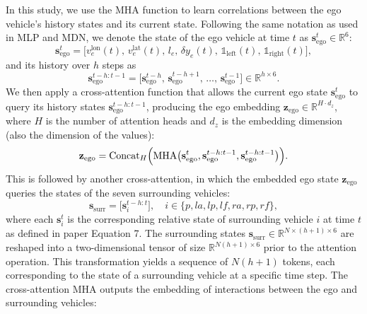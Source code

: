 \documentclass[journal]{IEEEtran}
\begin{document}
In this study, we use the MHA function to learn correlations between the ego vehicle's history states and its current state. Following the same notation as used in MLP and MDN, we denote the state of the ego vehicle at time $t$ as $\mathbf{s}_{\text{ego}}^{t}\in\mathbb{R}^{6}$:
\begin{equation}
    \mathbf{s}_{\text{ego}}^{t} = \bigl[
        v_e^{\text{lon}}(t),\,
        v_e^{\text{lat}}(t),\,
        l_e,\,
        \delta y_e(t),\,
        \mathds{1}_{\text{left}}(t),\,
        \mathds{1}_{\text{right}}(t)
        \bigr],
\end{equation}
and its history over $h$ steps as
\begin{equation}
    \mathbf{s}_{\text{ego}}^{t-h:t-1} = \bigl[
        \mathbf{s}_{\text{ego}}^{t-h},\,
        \mathbf{s}_{\text{ego}}^{t-h+1},\,
        \dots,\,
        \mathbf{s}_{\text{ego}}^{t-1}
        \bigr]\in \mathbb{R}^{h\times6}.
\end{equation}
We then apply a cross-attention function that allows the current ego state $\mathbf{s}_{\text{ego}}^{t}$ to query its history states $\mathbf{s}_{\text{ego}}^{t-h:t-1}$, producing the ego embedding $\mathbf{z}_{\text{ego}}\in \mathbb{R}^{H\cdot d_z}$, where $H$ is the number of attention heads and $d_z$ is the embedding dimension (also the dimension of the values):
\begin{equation}
    \mathbf{z}_{\text{ego}} = \text{Concat}_H\Bigl(\text{MHA}\bigl(\mathbf{s}_{\text{ego}}^{t},\mathbf{s}_{\text{ego}}^{t-h:t-1},\mathbf{s}_{\text{ego}}^{t-h:t-1}\bigr)\Bigr).
\end{equation}
This is followed by another cross-attention, in which the embedded ego state $\mathbf{z}_{\text{ego}}$ queries the states of the seven surrounding vehicles:
\begin{equation}
    \mathbf{s}_{\text{surr}} = \bigl[\mathbf{s}_{i}^{t-h:t}\bigr], \quad i \in \{p, la, lp, lf, ra, rp, rf\},
\end{equation}
where each $\mathbf{s}_{i}^{t}$ is the corresponding relative state of surrounding vehicle $i$ at time $t$ as defined in paper Equation 7. The surrounding states $\mathbf{s}_{\text{surr}} \in \mathbb{R}^{N \times (h+1) \times 6}$ are reshaped into a two-dimensional tensor of size $\mathbb{R}^{N(h+1) \times 6}$ prior to the attention operation. This transformation yields a sequence of $N(h+1)$ tokens, each corresponding to the state of a surrounding vehicle at a specific time step. The cross-attention MHA outputs the embedding of interactions between the ego and surrounding vehicles:
\end{document}
